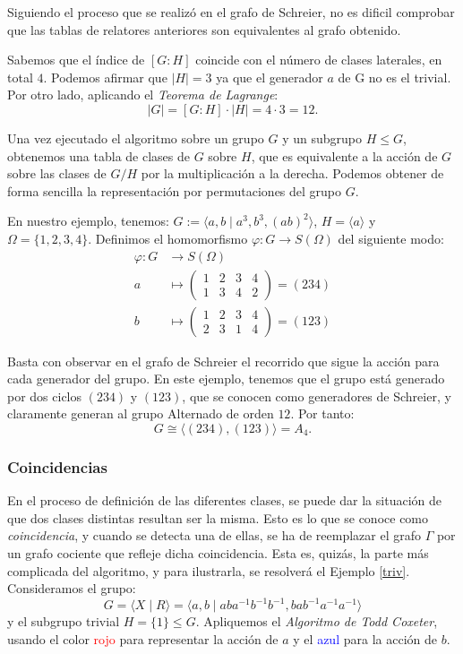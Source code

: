 Siguiendo el proceso que se realizó en el grafo de Schreier, no es dificil comprobar que las tablas de relatores anteriores son equivalentes al grafo obtenido.

Sabemos que el índice de $[G:H]$ coincide con el número de clases laterales, en total $4$. Podemos afirmar que $|H|=3$ ya que el generador $a$ de G no es el trivial. Por otro lado, aplicando el \textit{Teorema de Lagrange}:
\[
    |G|=[G:H]\cdot |H| = 4\cdot 3 = 12 .
\]


Una vez ejecutado el algoritmo sobre un grupo $G$ y un subgrupo $H \leq G$, obtenemos una tabla de clases de $G$ sobre $H$, que es equivalente a la acción de $G$ sobre las clases de $G/H$ por la multiplicación a la derecha. Podemos obtener de forma sencilla la representación por permutaciones del grupo $G$.


En nuestro ejemplo, tenemos: 
$ G :=\langle a,b \mid a^3, b^3, (ab)^2 \rangle$, $H=\langle a \rangle$ y $\Omega = \{1,2,3,4\}$. Definimos el homomorfismo $\varphi \colon G \to S(\Omega)$ del siguiente modo:
\begin{align*}
   \varphi \colon G &\longrightarrow S(\Omega)  \\
    a &\mapsto 
    \begin{pmatrix}
    1 & 2 & 3 & 4\\
    1 & 3 & 4 & 2 
    \end{pmatrix} = (234) \\
    b & \mapsto
    \begin{pmatrix}
    1 & 2 & 3 & 4\\
    2 & 3 & 1 & 4 
    \end{pmatrix} = 
    (123)
\end{align*}


Basta con observar en el grafo de Schreier el recorrido que sigue la acción para cada generador del grupo. En este ejemplo, tenemos que el grupo está generado por dos ciclos $(234)$ y $(123)$, que se conocen como generadores de Schreier, y claramente generan al grupo Alternado de orden $12$. Por tanto:
\[
    G \cong \langle(234),(123)\rangle = A_4 .
\]




\subsubsection{Coincidencias} \label{ident}

En el proceso de definición de las diferentes clases, se puede dar la situación de que dos clases distintas resultan ser la misma. Esto es lo que se conoce como \textit{coincidencia}, y cuando se detecta una de ellas, se ha de reemplazar el grafo $\Gamma$ por un grafo cociente que refleje dicha coincidencia. Esta es, quizás, la parte más complicada del algoritmo, y para ilustrarla, se resolverá el Ejemplo \ref{triv}.
Consideramos el grupo:
\[
    G = \langle X \mid R\rangle = \langle a,b \mid aba^{-1}b^{-1}b^{-1}, bab^{-1}a^{-1}a^{-1}  \rangle 
\]
y el subgrupo trivial $H=\{1\} \leq G $. Apliquemos el \textit{Algoritmo de Todd Coxeter}, usando el color \textcolor{red}{rojo} para representar la acción de $a$ y el \textcolor{blue}{azul} para la acción de $b$.


